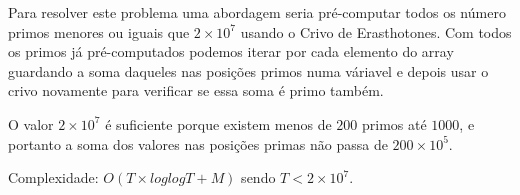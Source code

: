 Para resolver este problema uma abordagem seria pré-computar todos os número primos menores ou iguais que $2 \times 10^7$ usando o Crivo de Erasthotones. Com todos os primos já pré-computados podemos iterar por cada elemento do array guardando a soma daqueles nas posições primos numa váriavel e depois usar o crivo novamente para verificar se essa soma é primo também.

O valor $2 \times 10^7$ é suficiente porque existem menos de $200$ primos até $1000$, e portanto a soma dos valores nas posições primas não passa de $200 \times 10^5$.

Complexidade: $O(T \times log log T + M)$ sendo $T < 2 \times 10^7$.
